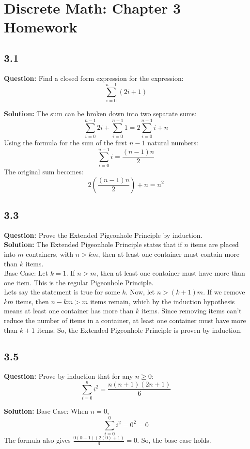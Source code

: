 \documentclass{article}
\begin{document}
\section*{Discrete Math: Chapter 3 Homework}

\subsection*{3.1}
\textbf{Question:} Find a closed form expression for the expression:
\[ \sum_{i=0}^{n-1} (2i + 1) \]

\textbf{Solution:}
The sum can be broken down into two separate sums:
\[ \sum_{i=0}^{n-1} 2i + \sum_{i=0}^{n-1} 1 = 2 \sum_{i=0}^{n-1} i + n \]
Using the formula for the sum of the first \(n-1\) natural numbers:
\[ \sum_{i=0}^{n-1} i = \frac{(n-1)n}{2} \]
The original sum becomes:
\[ 2\left( \frac{(n-1)n}{2} \right) + n = n^2 \]

\subsection*{3.3}
\textbf{Question:} Prove the Extended Pigeonhole Principle by induction.
\\[1\baselineskip]
\textbf{Solution:}
The Extended Pigeonhole Principle states that if \(n\) items are placed into \(m\) containers, with \(n > km\), then at least one container must contain more than \(k\) items. 
\\[1\baselineskip]
Base Case: Let \(k=1\). If \(n > m\), then at least one container must have more than one item. This is the regular Pigeonhole Principle.
\\[1\baselineskip]
Lets say the statement is true for some \(k\). Now, let \(n > (k+1)m\). If we remove \(km\) items, then \(n-km > m\) items remain, which by the induction hypothesis means at least one container has more than \(k\) items. Since removing items can't reduce the number of items in a container, at least one container must have more than \(k+1\) items. So, the Extended Pigeonhole Principle is proven by induction.

\subsection*{3.5}
\textbf{Question:} Prove by induction that for any \( n \geq 0 \):
\[ \sum_{i=0}^{n} i^2 = \frac{n(n+1)(2n+1)}{6} \]

\textbf{Solution:}
Base Case:
When \(n = 0\),
\[ \sum_{i=0}^{0} i^2 = 0^2 = 0 \]
The formula also gives \( \frac{0(0+1)(2(0)+1)}{6} = 0 \). So, the base case holds.
\end{document}
